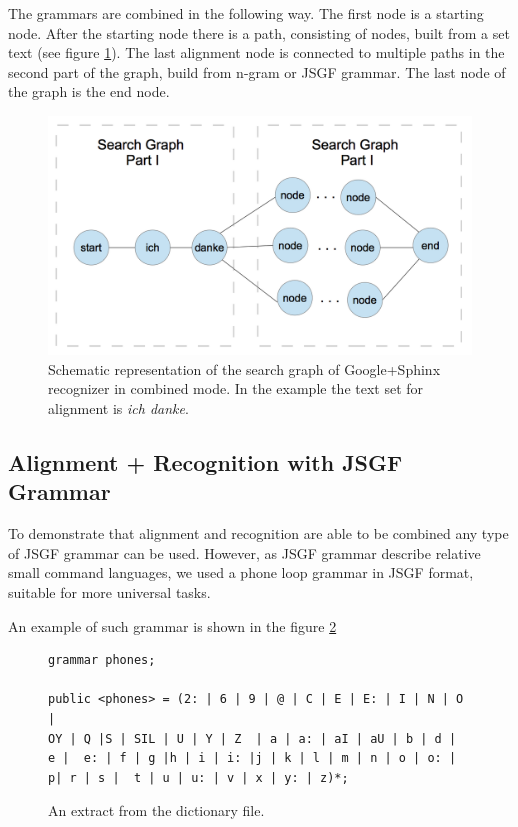 The grammars are combined in the following way. The first node is
a starting node. After the starting node there is a path, consisting of nodes,
built from a set text (see figure  \ref{fig:graph}). The last alignment
node is connected to multiple paths in the second part of the graph, build from n-gram
or JSGF grammar. The last node of the graph is the end node.
\begin{figure}[htbp]
  \centering
    \includegraphics[width=1.0\textwidth]{images/searchgraph.png}
 \caption{Schematic representation of the search graph of Google+Sphinx
 recognizer in combined mode. In the example the text set for alignment is
 \textit {ich danke}.}
  \label{fig:graph}
\end {figure}

\subsection {Alignment + Recognition with JSGF Grammar}
To demonstrate that alignment and recognition are able to be combined any
type of JSGF grammar can be used. However, as JSGF grammar describe 
relative small command languages, we used a phone loop grammar in JSGF format,
suitable for more universal tasks.

An example of such grammar is shown in the figure   \ref{fig:phone_loop}

\begin{figure}[htbp]
\lstset{language=XML} 
%  
%  
\begin{lstlisting}[frame=single]
grammar phones;

public <phones> = (2: | 6 | 9 | @ | C | E | E: | I | N | O |
OY | Q |S | SIL | U | Y | Z  | a | a: | aI | aU | b | d |
e |  e: | f | g |h | i | i: |j | k | l | m | n | o | o: |
p| r | s |  t | u | u: | v | x | y: | z)*;
\end{lstlisting}
 \caption{An extract from the dictionary file.}
  \label{fig:phone_loop}
\end {figure}

